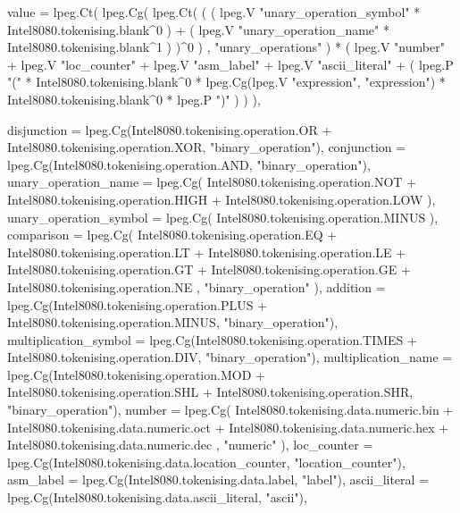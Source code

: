 {        value = lpeg.Ct(
            lpeg.Cg(
                lpeg.Ct(
                    (
                        (
                            lpeg.V "unary_operation_symbol"
                            * Intel8080.tokenising.blank^0
                        )
                        +
                        (
                            lpeg.V "unary_operation_name"
                            * Intel8080.tokenising.blank^1
                        )
                    )^0
                )
                , "unary_operations"
            )
            * (
                lpeg.V "number"
                + lpeg.V "loc_counter"
                + lpeg.V "asm_label"
                + lpeg.V "ascii_literal"
                + (
                    lpeg.P "("
                    * Intel8080.tokenising.blank^0
                    * lpeg.Cg(lpeg.V "expression", "expression")
                    * Intel8080.tokenising.blank^0
                    * lpeg.P ")"
                )
            )
        ),

        disjunction = lpeg.Cg(Intel8080.tokenising.operation.OR + Intel8080.tokenising.operation.XOR, "binary_operation"),
        conjunction = lpeg.Cg(Intel8080.tokenising.operation.AND, "binary_operation"),
        unary_operation_name = lpeg.Cg(
            Intel8080.tokenising.operation.NOT
            + Intel8080.tokenising.operation.HIGH
            + Intel8080.tokenising.operation.LOW
        ),
        unary_operation_symbol = lpeg.Cg(
            Intel8080.tokenising.operation.MINUS
        ),
        comparison = lpeg.Cg(
            Intel8080.tokenising.operation.EQ
            + Intel8080.tokenising.operation.LT
            + Intel8080.tokenising.operation.LE
            + Intel8080.tokenising.operation.GT
            + Intel8080.tokenising.operation.GE
            + Intel8080.tokenising.operation.NE
            , "binary_operation"
        ),
        addition = lpeg.Cg(Intel8080.tokenising.operation.PLUS + Intel8080.tokenising.operation.MINUS, "binary_operation"),
        multiplication_symbol = lpeg.Cg(Intel8080.tokenising.operation.TIMES + Intel8080.tokenising.operation.DIV, "binary_operation"),
        multiplication_name = lpeg.Cg(Intel8080.tokenising.operation.MOD + Intel8080.tokenising.operation.SHL + Intel8080.tokenising.operation.SHR, "binary_operation"),
        number = lpeg.Cg(
            Intel8080.tokenising.data.numeric.bin
            + Intel8080.tokenising.data.numeric.oct
            + Intel8080.tokenising.data.numeric.hex
            + Intel8080.tokenising.data.numeric.dec
            , "numeric"
        ),
        loc_counter = lpeg.Cg(Intel8080.tokenising.data.location_counter, "location_counter"),
        asm_label = lpeg.Cg(Intel8080.tokenising.data.label, "label"),
        ascii_literal = lpeg.Cg(Intel8080.tokenising.data.ascii_literal, "ascii"),
    }


